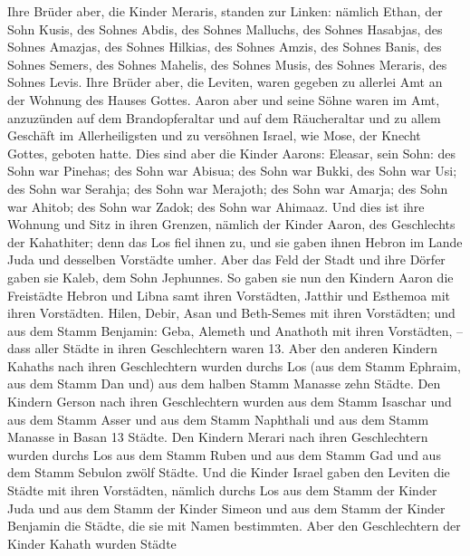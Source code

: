  Ihre Brüder aber, die Kinder Meraris, standen zur
Linken: nämlich Ethan, der Sohn Kusis, des Sohnes Abdis, des Sohnes
Malluchs,  des Sohnes Hasabjas, des Sohnes Amazjas, des
Sohnes Hilkias,  des Sohnes Amzis, des Sohnes Banis, des
Sohnes Semers,  des Sohnes Mahelis, des Sohnes Musis, des
Sohnes Meraris, des Sohnes Levis.  Ihre Brüder aber, die
Leviten, waren gegeben zu allerlei Amt an der Wohnung des Hauses Gottes.
 Aaron aber und seine Söhne waren im Amt, anzuzünden auf
dem Brandopferaltar und auf dem Räucheraltar und zu allem Geschäft im
Allerheiligsten und zu versöhnen Israel, wie Mose, der Knecht Gottes,
geboten hatte.  Dies sind aber die Kinder Aarons:
Eleasar, sein Sohn: des Sohn war Pinehas; des Sohn war Abisua;
 des Sohn war Bukki, des Sohn war Usi; des Sohn war
Serahja;  des Sohn war Merajoth; des Sohn war Amarja; des
Sohn war Ahitob;  des Sohn war Zadok; des Sohn war
Ahimaaz.  Und dies ist ihre Wohnung und Sitz in ihren
Grenzen, nämlich der Kinder Aaron, des Geschlechts der Kahathiter; denn
das Los fiel ihnen zu,  und sie gaben ihnen Hebron im
Lande Juda und desselben Vorstädte umher.  Aber das Feld
der Stadt und ihre Dörfer gaben sie Kaleb, dem Sohn Jephunnes.
 So gaben sie nun den Kindern Aaron die Freistädte Hebron
und Libna samt ihren Vorstädten, Jatthir und Esthemoa mit ihren
Vorstädten.  Hilen, Debir,  Asan und
Beth-Semes mit ihren Vorstädten;  und aus dem Stamm
Benjamin: Geba, Alemeth und Anathoth mit ihren Vorstädten, -- dass aller
Städte in ihren Geschlechtern waren 13.  Aber den anderen
Kindern Kahaths nach ihren Geschlechtern wurden durchs Los (aus dem
Stamm Ephraim, aus dem Stamm Dan und) aus dem halben Stamm Manasse zehn
Städte.  Den Kindern Gerson nach ihren Geschlechtern
wurden aus dem Stamm Isaschar und aus dem Stamm Asser und aus dem Stamm
Naphthali und aus dem Stamm Manasse in Basan 13 Städte. 
Den Kindern Merari nach ihren Geschlechtern wurden durchs Los aus dem
Stamm Ruben und aus dem Stamm Gad und aus dem Stamm Sebulon zwölf
Städte.  Und die Kinder Israel gaben den Leviten die
Städte mit ihren Vorstädten,  nämlich durchs Los aus dem
Stamm der Kinder Juda und aus dem Stamm der Kinder Simeon und aus dem
Stamm der Kinder Benjamin die Städte, die sie mit Namen bestimmten.
 Aber den Geschlechtern der Kinder Kahath wurden Städte
